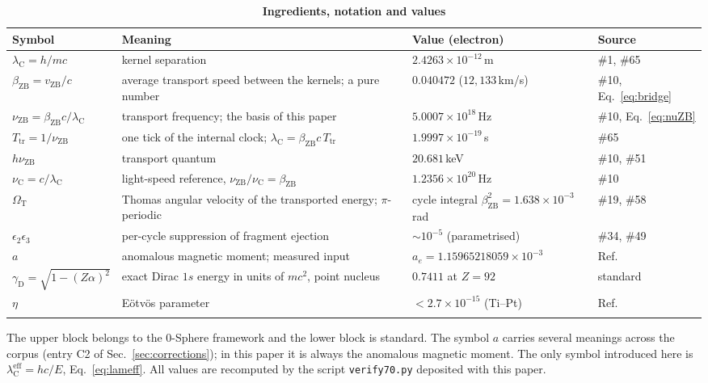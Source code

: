 \documentclass[%
 reprint, amsmath,amssymb, aps, prb, ]{revtex4-2}
\numberwithin{equation}{section}
\newcommand{\vZB}{v_{\text{ZB}}}
\newcommand{\betaZB}{\beta_{\text{ZB}}}
\newcommand{\lambdaC}{\lambda_{\text{C}}}
\newcommand{\nuZB}{\nu_{\text{ZB}}}
\newcommand{\nuC}{\nu_{\text{C}}}
\newcommand{\Ttr}{T_{\text{tr}}}
\newcommand{\OmT}{\Omega_{\text{T}}}
\newcommand{\gammaD}{\gamma_{\text{D}}}
\begin{document}
\begin{table}[t!]
\centering
\caption{\textbf{Ingredients, notation and values}}
\label{tab:ingredients}
\renewcommand{\arraystretch}{1.4}
\setlength{\tabcolsep}{8pt}
\begin{tabular}{>{\raggedright\arraybackslash}p{2.4cm}>{\raggedright\arraybackslash}p{6.4cm}>{\raggedright\arraybackslash}p{3.6cm}>{\raggedright\arraybackslash}p{2.2cm}}
\toprule
\textbf{Symbol} & \textbf{Meaning} & \textbf{Value (electron)} & \textbf{Source} \\
\midrule
$\lambdaC = h/mc$
& kernel separation
& $2.4263\times10^{-12}$\,m
& \#1, \#65 \\
\addlinespace[0.3cm]
$\betaZB = \vZB/c$
& average transport speed between the kernels; a pure number
& $0.040472$ ($12{,}133$\,km/s)
& \#10, Eq.~\eqref{eq:bridge} \\
\addlinespace[0.3cm]
$\nuZB = \betaZB c/\lambdaC$
& transport frequency; the basis of this paper
& $5.0007\times10^{18}$\,Hz
& \#10, Eq.~\eqref{eq:nuZB} \\
\addlinespace[0.3cm]
$\Ttr = 1/\nuZB$
& one tick of the internal clock; $\lambdaC = \betaZB c\,\Ttr$
& $1.9997\times10^{-19}$\,s
& \#65 \\
\addlinespace[0.3cm]
$h\nuZB$
& transport quantum
& $20.681$\,keV
& \#10, \#51 \\
\addlinespace[0.3cm]
$\nuC = c/\lambdaC$
& light-speed reference, $\nuZB/\nuC = \betaZB$
& $1.2356\times10^{20}$\,Hz
& \#10 \\
\addlinespace[0.3cm]
$\OmT$
& Thomas angular velocity of the transported energy; $\pi$-periodic
& cycle integral $\betaZB^{2} = 1.638\times10^{-3}$\,rad
& \#19, \#58 \\
\addlinespace[0.3cm]
$\epsilon_2\epsilon_3$
& per-cycle suppression of fragment ejection
& $\sim10^{-5}$ (parametrised)
& \#34, \#49 \\
\addlinespace[0.3cm]
$a$
& anomalous magnetic moment; measured input
& $a_e = 1.15965218059\times10^{-3}$
& Ref.~\cite{fan2023} \\
\addlinespace[0.3cm]
$\gammaD = \sqrt{1-(Z\alpha)^{2}}$
& exact Dirac $1s$ energy in units of $mc^{2}$, point nucleus
& $0.7411$ at $Z = 92$
& standard \\
\addlinespace[0.3cm]
$\eta$
& E\"otv\"os parameter
& $<2.7\times10^{-15}$ (Ti--Pt)
& Ref.~\cite{microscope2022} \\
\addlinespace[0.2cm]
\bottomrule
\end{tabular}
\vspace{0.2cm}
\begin{minipage}{0.95\textwidth}
\justifying\footnotesize
The upper block belongs to the 0-Sphere framework and the lower block is standard. The symbol $a$ carries several meanings across the corpus (entry C2 of Sec.~\ref{sec:corrections}); in this paper it is always the anomalous magnetic moment. The only symbol introduced here is $\lambdaC^{\text{eff}} = hc/E$, Eq.~\eqref{eq:lameff}. All values are recomputed by the script \texttt{verify70.py} deposited with this paper.
\end{minipage}
\end{table}
\end{document}
